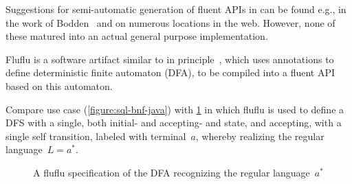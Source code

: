 Suggestions for semi-automatic generation of fluent APIs in \Java can be found
e.g., in the work of Bodden~\cite{Bodden:14} and on numerous locations in the
web. However, none of these matured into an actual general purpose
implementation.  

Fluflu is a software artifact similar
to in principle~\Fajita, which uses \Java annotations to define deterministic finite
automaton (DFA), to be compiled into a fluent API based on this automaton. 

Compare \Fajita use case (\cref{figure:sql-bnf-java}) with \cref{figure:fluflu} in
which fluflu is used to define a DFS with a single, both initial- and
accepting- and  state, and accepting, with a single self transition, labeled
with terminal~$a$, whereby realizing the regular language~$L=a^*$.

\begin{figure}[H]
  \caption{\label{figure:fluflu}
    A fluflu specification of the DFA recognizing the regular language~$a^*$}
\end{figure}
